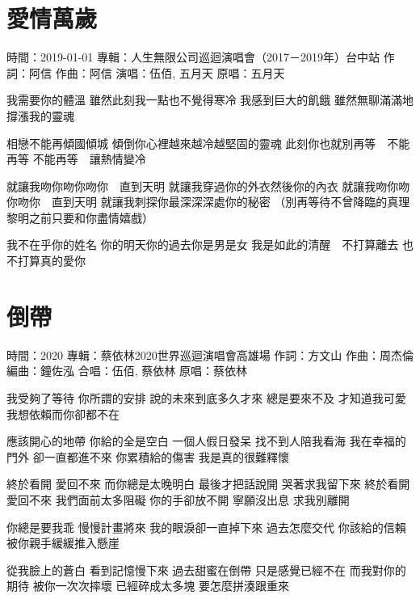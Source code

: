 \documentclass[UTF8,a4paper,oneside,twocolumn,12pt]{ctexbook}
\newcommand{\infopair}[2]{\textbullet #1：#2}
\newcommand{\zc}[1][伍佰]{\infopair{作詞}{#1}}
\newcommand{\zq}[1][伍佰]{\infopair{作曲}{#1}}
\newcommand{\bq}[1][伍佰]{\infopair{編曲}{#1}}
\newcommand{\zj}[1]{\infopair{專輯}{#1}}
\newcommand{\yc}[1]{\infopair{原唱}{#1}}
\newcommand{\sj}[1]{\infopair{時間}{#1}}
\newenvironment{info}{\begin{flushleft}\kaishu
	}
	{\end{flushleft}\normalsize\yahei\par}
\newenvironment{lyric}{
	}
{}
\begin{document}
\section{愛情萬歲}%
\begin{info}
	\sj{2019-01-01}
	\zj{人生無限公司巡迴演唱會（2017－2019年）台中站}
	\zc[阿信]
	\zq[阿信]
	\infopair{演唱}{伍佰, 五月天}
	\yc{五月天}
\end{info}
\begin{lyric}
	我需要你的體溫
	雖然此刻我一點也不覺得寒冷
	我感到巨大的飢餓
	雖然無聊滿滿地撐漲我的靈魂

	相戀不能再傾國傾城
	傾倒你心裡越來越冷越堅固的靈魂
	此刻你也就別再等　不能再等
	不能再等　讓熱情變冷

	就讓我吻你吻你吻你　直到天明
	就讓我穿過你的外衣然後你的內衣
	就讓我吻你吻你吻你　直到天明
	就讓我刺探你最深深深處你的秘密
	（別再等待不曾降臨的真理
	黎明之前只要和你盡情嬉戲）

	我不在乎你的姓名
	你的明天你的過去你是男是女
	我是如此的清醒　不打算離去
	也不打算真的愛你
\end{lyric}

\section{倒帶}
\begin{info}
	\sj{2020}
	\zj{蔡依林2020世界巡迴演唱會高雄場}
	\zc[方文山]
	\zq[周杰倫]
	\bq[鐘佐泓]
	\infopair{合唱}{伍佰, 蔡依林}
	\yc{蔡依林}
\end{info}
\begin{lyric}
	我受夠了等待 你所謂的安排
	說的未來到底多久才來
	總是要來不及 才知道我可愛
	我想依賴而你卻都不在

	應該開心的地帶 你給的全是空白
	一個人假日發呆 找不到人陪我看海
	我在幸福的門外 卻一直都進不來
	你累積給的傷害 我是真的很難釋懷

	終於看開 愛回不來 而你總是太晚明白
	最後才把話說開 哭著求我留下來
	終於看開 愛回不來 我們面前太多阻礙
	你的手卻放不開 寧願沒出息 求我別離開

	你總是要我乖 慢慢計畫將來
	我的眼淚卻一直掉下來
	過去怎麼交代 你該給的信賴
	被你親手緩緩推入懸崖

	從我臉上的蒼白 看到記憶慢下來
	過去甜蜜在倒帶 只是感覺已經不在
	而我對你的期待 被你一次次摔壞
	已經碎成太多塊 要怎麼拼湊跟重來
\end{lyric}
\end{document}
